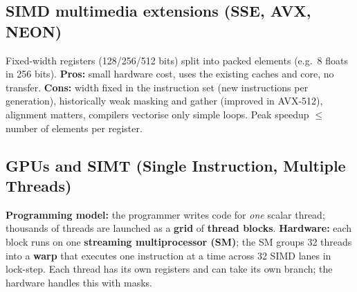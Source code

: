 \subsection{SIMD multimedia extensions (SSE, AVX, NEON)}
Fixed-width registers (128/256/512 bits) split into packed elements (e.g.\ 8 floats in 256 bits). \textbf{Pros:} small hardware cost, uses the existing caches and core, no transfer. \textbf{Cons:} width fixed in the instruction set (new instructions per generation), historically weak masking and gather (improved in AVX-512), alignment matters, compilers vectorise only simple loops. Peak speedup $\le$ number of elements per register.

\subsection{GPUs and SIMT (Single Instruction, Multiple Threads)}\label{sec:simt}
\textbf{Programming model:} the programmer writes code for \emph{one} scalar thread; thousands of threads are launched as a \textbf{grid} of \textbf{thread blocks}. \textbf{Hardware:} each block runs on one \textbf{streaming multiprocessor (SM)}; the SM groups 32 threads into a \textbf{warp} that executes one instruction at a time across 32 SIMD lanes in lock-step. Each thread has its own registers and can take its own branch; the hardware handles this with masks.
